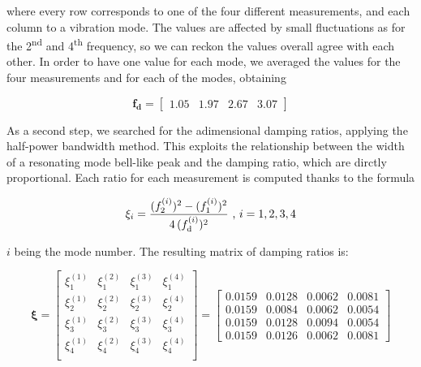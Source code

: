 \documentclass[a4paper,12pt,oneside]{article}
\begin{document}
where every row corresponds to one of the four different measurements, and each column to a vibration mode. The values are affected by small fluctuations as for the 2\textsuperscript{nd} and 4\textsuperscript{th} frequency, so we can reckon the values overall agree with each other. In order to have one value for each mode, we averaged the values for the four measurements and for each of the modes, obtaining

\[
	\mathbf{f_d} =	\begin{bmatrix}
										1.05 & 1.97 & 2.67 & 3.07
									\end{bmatrix}
\]

As a second step, we searched for the adimensional damping ratios, applying the half-power bandwidth method. This exploits the relationship between the width of a resonating mode bell-like peak and the damping ratio, which are dirctly proportional. Each ratio for each measurement is computed thanks to the formula

\[
	\xi_i = \frac{(f^{(i)}_2)^2 - (f^{(i)}_1)^2}{4 \, (f^{(i)}_\textup{d})^2}
		~ \text{,} ~ i = 1,2,3,4
\]

$ i $ being the mode number. The resulting matrix of damping ratios is:

\[
	\bm{\xi} =	\begin{bmatrix}
								\xi_1^{(1)}	& \xi_1^{(2)} & \xi_1^{(3)}	& \xi_1^{(4)} \\
								\xi_2^{(1)}	& \xi_2^{(2)} & \xi_2^{(3)}	& \xi_2^{(4)} \\
								\xi_3^{(1)}	& \xi_3^{(2)} & \xi_3^{(3)}	& \xi_3^{(4)} \\
								\xi_4^{(1)}	& \xi_4^{(2)} & \xi_4^{(3)}	& \xi_4^{(4)} \\
							\end{bmatrix} = \begin{bmatrix}
																0.0159	& 0.0128	& 0.0062	& 0.0081 \\
																0.0159	& 0.0084	& 0.0062	& 0.0054 \\
																0.0159	& 0.0128	& 0.0094	& 0.0054 \\
																0.0159	& 0.0126	& 0.0062	& 0.0081
															\end{bmatrix}
\]
\end{document}
